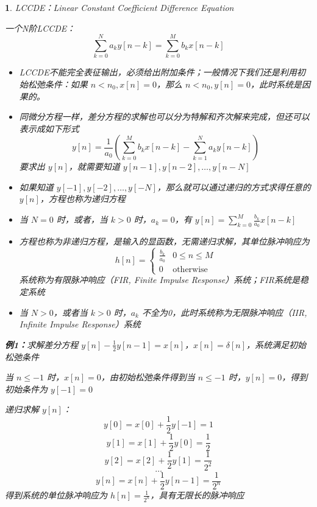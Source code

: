 \documentclass[UTF8]{report}
\theoremstyle{MyLineTheoremStyle} %
\theoremstyle{MyBlockTheoremStyle} %
\theoremstyle{MySubsubsectionStyle} %
\newtheorem{definition}{}
\begin{document}
\begin{definition}
    LCCDE：Linear Constant Coefficient Difference Equation
    
    一个N阶LCCDE：
    \[
    \sum_{k=0}^{N} a_k y[n - k] = \sum_{k=0}^{M} b_k x[n - k]
    \]
    
    \begin{itemize}
        \item LCCDE不能完全表征输出，必须给出附加条件；一般情况下我们还是利用初始松弛条件：如果 $n < n_0, x[n] = 0$，那么 $n < n_0, y[n] = 0$，此时系统是因果的。
        \item 同微分方程一样，差分方程的求解也可以分为特解和齐次解来完成，但还可以表示成如下形式
        \[
        y[n] = \frac{1}{a_0} \left( \sum_{k=0}^{M} b_k x[n - k] - \sum_{k=1}^{N} a_k y[n - k] \right)
        \]
        要求出 $y[n]$，就需要知道 $y[n - 1], y[n - 2], \ldots, y[n - N]$
        \item 如果知道 $y[-1], y[-2], \ldots, y[-N]$，那么就可以通过递归的方式求得任意的 $y[n]$，方程也称为递归方程
    \end{itemize}
    
    \begin{itemize}
        \item 当 $N = 0$ 时，或者，当 $k > 0$ 时，$a_k = 0$，有 $y[n] = \sum_{k=0}^{M} \frac{b_k}{a_0} x[n - k]$
        \item 方程也称为非递归方程，是输入的显函数，无需递归求解，其单位脉冲响应为
        \[
        h[n] = 
        \begin{cases} 
        \frac{b_k}{a_0} & 0 \leq n \leq M \\
        0 & \text{otherwise}
        \end{cases}
        \]
        系统称为有限脉冲响应（FIR, Finite Impulse Response）系统；FIR系统是稳定系统
        \item 当 $N > 0$，或者当 $k > 0$ 时，$a_k$ 不全为0，此时系统称为无限脉冲响应（IIR, Infinite Impulse Response）系统
    \end{itemize}
    
    \textbf{例1：}求解差分方程 $y[n] - \frac{1}{2} y[n - 1] = x[n]$，$x[n] = \delta[n]$，系统满足初始松弛条件
    
    当 $n \leq -1$ 时，$x[n] = 0$，由初始松弛条件得到当 $n \leq -1$ 时，$y[n] = 0$，得到初始条件为 $y[-1] = 0$
    
    递归求解 $y[n]$：
    \[
    y[0] = x[0] + \frac{1}{2} y[-1] = 1
    \]
    \[
    y[1] = x[1] + \frac{1}{2} y[0] = \frac{1}{2}
    \]
    \[
    y[2] = x[2] + \frac{1}{2} y[1] = \frac{1}{2^2}
    \]
    \[
    \ldots
    \]
    \[
    y[n] = x[n] + \frac{1}{2} y[n - 1] = \frac{1}{2^n}
    \]
    得到系统的单位脉冲响应为 $h[n] = \frac{1}{2^n}$，具有无限长的脉冲响应
    
    \end{definition}
\end{document}
